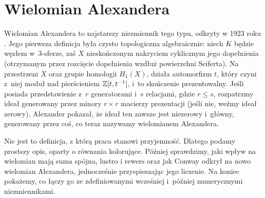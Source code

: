 
\section{Wielomian Alexandera}
%
Wielomian Alexandera to najstarszy niezmiennik tego typu, odkryty w 1923 roku \cite{alexander23}.
Jego pierwsza definicja była czysto topologiczna algebraicznie: niech $K$ będzie węzłem w~3-sferze, zaś $X$ nieskończonym nakryciem cyklicznym jego dopełnienia (otrzymanym przez rozcięcie dopełnienia wzdłuż powierzchni Seiferta).
Na przestrzeni $X$ oraz grupie homologii $H_1(X)$, działa automorfizm $t$, który czyni z~niej moduł nad pierścieniem $\mathbb Z[t, t^{-1}]$, i~to skończenie prezentowalny.
Jeśli posiada przedstawienie z~$r$ generatorami i~$s$ relacjami, gdzie $r \le s$, rozpatrzmy ideał generowany przez minory $r \times r$ macierzy prezentacji (jeśli nie, weźmy ideał zerowy).
Alexander pokazał, że ideał ten zawsze jest niezerowy i~główny, generowany przez coś, co teraz nazywamy wielomianem Alexandera.

Nie jest to definicja, z którą praca stanowi przyjemność.
Dlatego podamy prostszy opis, oparty o równania kolorujące.
Później sprawdzimy, jaki wpływ na wielomian mają suma spójna, lustro i rewers oraz jak Conway odkrył na nowo wielomian Alexandera, jednocześnie przyspieszając jego liczenie.
Na koniec pokażemy, co łączy go ze zdefiniowanymi wcześniej i~później numerycznymi niezmiennikami.













%
